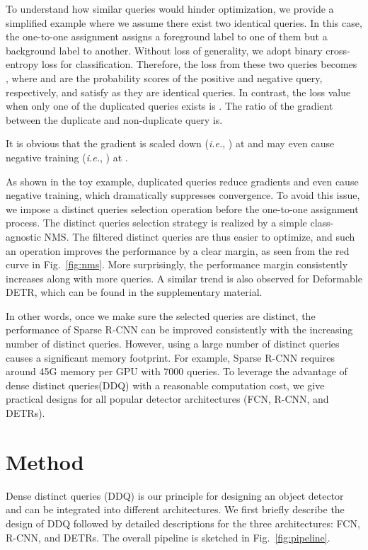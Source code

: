 \documentclass[10pt,twocolumn,letterpaper]{article}
\begin{document}
To understand how similar queries would hinder optimization, we provide a simplified example where we assume there exist two identical queries. In this case, the one-to-one assignment assigns a foreground label to one of them but a background label to another. Without loss of generality, we adopt binary cross-entropy loss for classification. Therefore, the loss from these two queries becomes , where  and  are the probability scores of the positive and negative query, respectively, and satisfy  as they are identical queries. In contrast, the loss value when only one of the duplicated queries exists is . The ratio  of the gradient between the duplicate and non-duplicate query is.
\vspace{-2mm}

It is obvious that the gradient is scaled down (\emph{i.e.}, ) at  and may even cause negative training (\emph{i.e.}, ) at .

As shown in the toy example, duplicated queries reduce gradients and even cause negative training, which dramatically suppresses convergence. To avoid this issue, we impose a distinct queries selection operation before the one-to-one assignment process.  The distinct queries selection strategy is realized by a simple class-agnostic NMS. The filtered distinct queries are thus easier to optimize, and such an operation improves the performance by a clear margin, as seen from the red curve in Fig.~\ref{fig:nms}. More surprisingly, the performance margin consistently increases along with more queries. A similar trend is also observed for Deformable DETR, which can be found in the supplementary material. 

In other words, once we make sure the selected queries are distinct, the performance of Sparse R-CNN can be improved consistently with the increasing number of distinct queries. However, using a large number of distinct queries causes a significant memory footprint. For example, Sparse R-CNN requires around 45G memory per GPU with 7000 queries. To leverage the advantage of dense distinct queries(DDQ) with a reasonable computation cost, we give practical designs for all popular detector architectures (FCN, R-CNN, and DETRs).



\section{Method}

Dense distinct queries (DDQ) is our principle for designing an object detector and can be integrated into different architectures. We first briefly describe the design of DDQ followed by detailed descriptions for the three architectures: FCN, R-CNN, and DETRs. The overall pipeline is sketched in Fig.~\ref{fig:pipeline}. 
\end{document}
